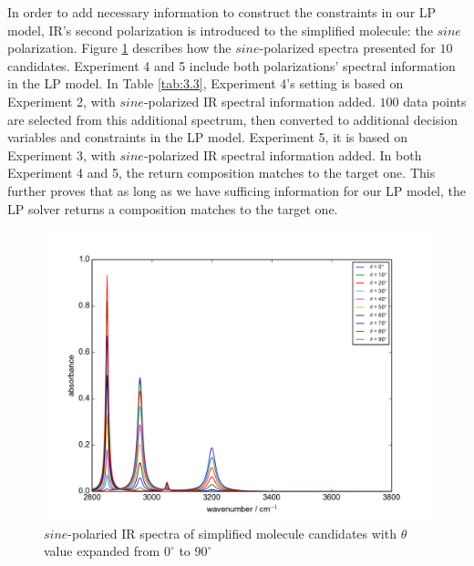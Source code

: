 In order to add necessary information to construct the constraints in our LP model, IR's second polarization is introduced to the simplified molecule: the $sine$ polarization. Figure \ref{fig:3.4} describes how the $sine$-polarized spectra presented for $10$ candidates. Experiment 4 and 5 include both polarizations' spectral information in the LP model. In Table \ref{tab:3.3}, Experiment 4's setting is based on Experiment 2, with $sine$-polarized IR spectral information added. $100$ data points are selected from this additional spectrum, then converted to additional decision variables and constraints in the LP model. Experiment 5, it is based on Experiment 3, with $sine$-polarized IR spectral information added. In both Experiment 4 and 5, the return composition matches to the target one. This further proves that as long as we have sufficing information for our LP model, the LP solver returns a composition matches to the target one. \\ 

\begin{figure}[!ht]
\centering
\includegraphics[scale=0.7]{Figures/Toy_Model_IR_Sine_Projection.png} 
\caption{$sine$-polaried IR spectra of simplified molecule candidates with $\theta$ value expanded from $0^{\circ}$ to $90^{\circ}$}  \label{fig:3.4}
\end{figure}


